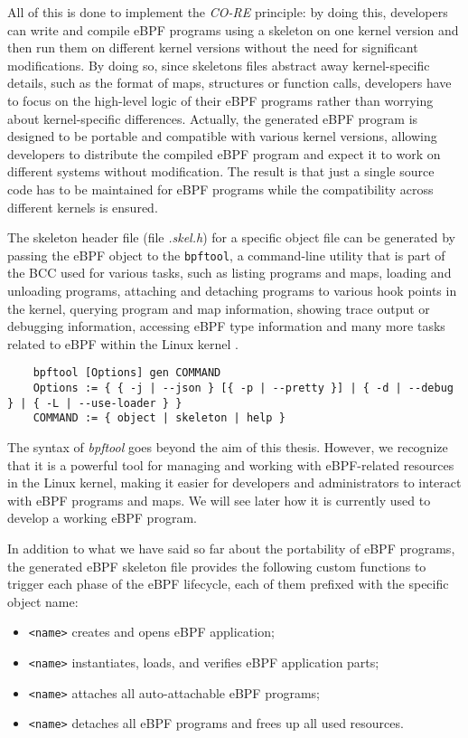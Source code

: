 All of this is done to implement the \textit{CO-RE} principle: by doing this, developers can write and compile eBPF programs using a skeleton on one kernel version and then run them on different kernel versions without the need for significant modifications.
By doing so, since skeletons files abstract away kernel-specific details, such as the format of maps, structures or function calls, developers have to focus on the high-level logic of their eBPF programs rather than worrying about kernel-specific differences.
Actually, the generated eBPF program is designed to be portable and compatible with various kernel versions, allowing developers to distribute the compiled eBPF program and expect it to work on different systems without modification.
The result is that just a single source code has to be maintained for eBPF programs while the compatibility across different kernels is ensured.

The skeleton header file (file \textit{.skel.h}) for a specific object file can be generated by passing the eBPF object to the \verb|bpftool|, a command-line utility that is part of the BCC used for various tasks, such as listing programs and maps, loading and unloading programs, attaching and detaching programs to various hook points in the kernel, querying program and map information, showing trace output or debugging information, accessing eBPF type information and many more tasks related to eBPF within the Linux kernel \cite{bpftoolGitHubRepo}.

\begin{lstlisting}
	bpftool [Options] gen COMMAND
	Options := { { -j | --json } [{ -p | --pretty }] | { -d | --debug } | { -L | --use-loader } }
	COMMAND := { object | skeleton | help }
\end{lstlisting}

The syntax of \textit{bpftool} goes beyond the aim of this thesis.
However, we recognize that it is a powerful tool for managing and working with eBPF-related resources in the Linux kernel, making it easier for developers and administrators to interact with eBPF programs and maps.
We will see later how it is currently used to develop a working eBPF program.

In addition to what we have said so far about the portability of eBPF programs, the generated eBPF skeleton file provides the following custom functions to trigger each phase of the eBPF lifecycle, each of them prefixed with the specific object name:

\begin{itemize}
	\item \texttt{<name>} creates and opens eBPF application;
	\item \texttt{<name>} instantiates, loads, and verifies 
		eBPF application parts;
	\item \texttt{<name>} attaches all auto-attachable eBPF 
		programs;
	\item \texttt{<name>} detaches all eBPF programs and 
		frees up all used resources.
\end{itemize}

